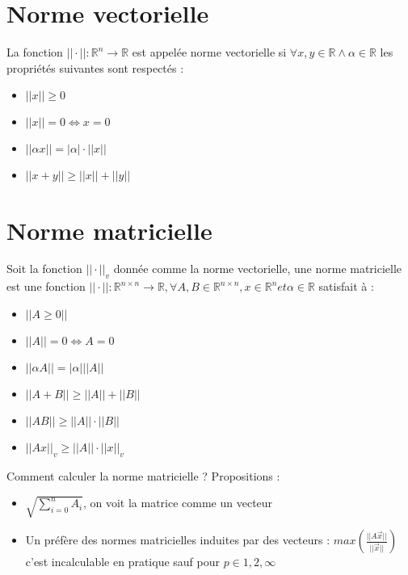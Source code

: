 \documentclass[11pt,a4paper]{report}
\newcommand{\vecnorm}[1]{||#1||}
\begin{document}
\section{Norme vectorielle}

La fonction $||\cdot|| : \mathbb{R}^n \rightarrow \mathbb{R}$ est appelée norme vectorielle si $\forall x,y \in \mathbb{R} \wedge \alpha \in \mathbb{R}$ les propriétés suivantes sont respectés :
\begin{itemize}
    \item $\vecnorm{x} \geq 0$
    \item $\vecnorm{x} = 0 \Longleftrightarrow x = 0$
    \item $\vecnorm{\alpha x} = |\alpha|\cdot\vecnorm{x}$
    \item $\vecnorm{x+y} \geq \vecnorm{x} + \vecnorm{y}$
\end{itemize}

\section{Norme matricielle}

Soit la fonction $\vecnorm{\cdot}_v$ donnée comme la norme vectorielle, une norme matricielle est une fonction $\vecnorm{\cdot} : \mathbb{R}^{n \times n} \rightarrow \mathbb{R}, \forall A,B \in \mathbb{R}^{n \times n}, x \in \mathbb{R}^n et \alpha \in \mathbb{R}$ satisfait à :
\begin{itemize}
    \item $\vecnorm{A \geq 0}$
    \item $\vecnorm{A} = 0 \Longleftrightarrow A = 0$
    \item $\vecnorm{\alpha A} = |\alpha| \vecnorm{A}$
    \item $\vecnorm{A+B} \geq \vecnorm{A} + \vecnorm{B}$
    \item $\vecnorm{AB}  \geq \vecnorm{A} \cdot \vecnorm{B}$
    \item $\vecnorm{Ax}_v \geq \vecnorm{A} \cdot \vecnorm{x}_v$
\end{itemize}

Comment calculer la norme matricielle ? Propositions :
\begin{itemize}
    \item $\sqrt{\sum^n_{i=0} A_i}$, on voit la matrice comme un vecteur
    \item Un préfère des normes matricielles induites par des vecteurs : $max(\frac{\vecnorm{A\overrightarrow{x}}}{\vecnorm{\overrightarrow{x}}})$ c'est incalculable en pratique sauf pour $p \in {1,2,\infty}$
    \end{itemize}
\end{document}
